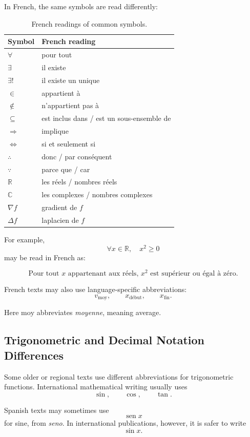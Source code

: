 \documentclass[11pt,twocolumn]{article}
\newcommand{\R}{\mathbb{R}}
\newcommand{\C}{\mathbb{C}}
\newcommand{\sen}{\operatorname{sen}}
\begin{document}
In French, the same symbols are read differently:

\begin{table}[ht]
\centering
\caption{French readings of common symbols.}
\begin{tabular}{ll}
\toprule
Symbol & French reading \\
\midrule
$\forall$ & pour tout \\
$\exists$ & il existe \\
$\exists!$ & il existe un unique \\
$\in$ & appartient à \\
$\notin$ & n'appartient pas à \\
$\subseteq$ & est inclus dans / est un sous-ensemble de \\
$\Rightarrow$ & implique \\
$\Leftrightarrow$ & si et seulement si \\
$\therefore$ & donc / par conséquent \\
$\because$ & parce que / car \\
$\R$ & les réels / nombres réels \\
$\C$ & les complexes / nombres complexes \\
$\nabla f$ & gradient de \(f\) \\
$\Delta f$ & laplacien de \(f\) \\
\bottomrule
\end{tabular}
\end{table}

For example,
\[
\forall x \in \R,\quad x^2 \ge 0
\]
may be read in French as:

\[
\text{Pour tout } x \text{ appartenant aux réels, } x^2
\text{ est supérieur ou égal à zéro.}
\]

French texts may also use language-specific abbreviations:
\[
v_{\text{moy}},
\qquad
x_{\text{début}},
\qquad
x_{\text{fin}}.
\]

Here \(\text{moy}\) abbreviates \emph{moyenne}, meaning average.

\subsection{Trigonometric and Decimal Notation Differences}

Some older or regional texts use different abbreviations for trigonometric
functions. International mathematical writing usually uses
\[
\sin,
\qquad
\cos,
\qquad
\tan.
\]

Spanish texts may sometimes use
\[
\sen x
\]
for sine, from \emph{seno}. In international publications, however, it is safer
to write
\[
\sin x.
\]
\end{document}
